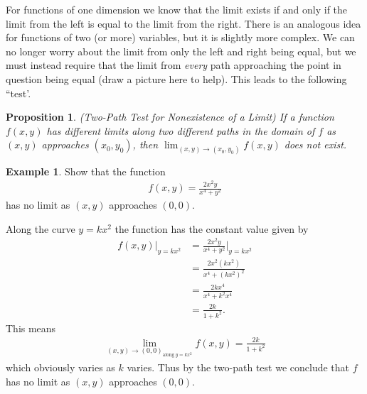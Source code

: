 \documentclass[12pt, letter]{article}
\theoremstyle{plain}
\newtheorem{proposition}[theorem]{Proposition}
\numberwithin{theorem}{section}
\theoremstyle{definition}
\newtheorem{example}[theorem]{Example}
\begin{document}
\hrulefill

\bigskip

For functions of one dimension we know that the limit exists if and only if the limit from the left is equal to the limit from the right. There is an analogous idea for functions of two (or more) variables, but it is slightly more complex. We can no longer worry about the limit from only the left and right being equal, but we must instead require that the limit from \textit{every} path approaching the point in question being equal (draw a picture here to help). This leads to the following ``test'.

\bigskip

\begin{proposition}{\textrm{(Two-Path Test for Nonexistence of a Limit)}}
If a function $f(x,y)$ has different limits along two different paths in the domain of $f$ as $(x,y)$ approaches $(x_0,y_0)$, then $\lim_{(x,y)\to (x_0,y_0)} f(x,y)$ does not exist.
\end{proposition}

\bigskip

\hrulefill

\bigskip

\begin{example}
Show that the function
\begin{align*}
f(x,y) = \frac{2x^2y}{x^4+y^2}
\end{align*}
has no limit as $(x,y)$ approaches $(0,0)$.

\smallskip

Along the curve $y=kx^2$ the function has the constant value given by
\begin{align*}
f(x,y) \rvert_{y=kx^2} &= \frac{2x^2y}{x^4+y^2} \rvert_{y=kx^2}\\
&= \frac{2x^2(kx^2)}{x^4+(kx^2)^2}\\
&= \frac{2kx^4}{x^4+k^2x^4}\\
&= \frac{2k}{1+k^2}.
\end{align*}
This means
\begin{align*}
\lim_{(x,y) \to (0,0)_{\text{along} \ y=kx^2}} f(x,y) = \frac{2k}{1+k^2}
\end{align*}
which obviously varies as $k$ varies. Thus by the two-path test we conclude that $f$ has no limit as $(x,y)$ approaches $(0,0)$.
\end{example}

\bigskip

\hrulefill

\bigskip
\end{document}
